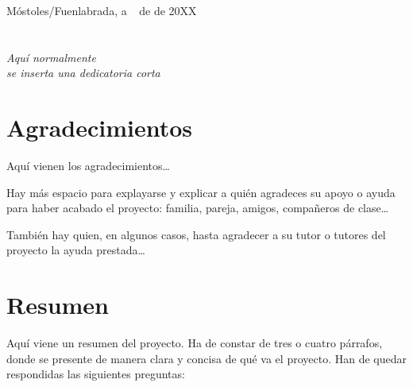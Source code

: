 \documentclass[
paper=a4,
fontsize=12pt,
twoside,
openright,                  %
titlepage,                  %
headsepline,                %
footheight=16pt,            %
parskip=half+,				%
numbers=noenddot,			%
headinclude=true,           %
footinclude=true,           %
cleardoublepage=empty,      %
captions=tableheading,      %
BCOR=12mm, 				    %
DIV=12   			        %
usegeometry=true			%
]{scrbook}
\begin{document}
{\vspace{0.8cm}
\begin{flushright}
Móstoles/Fuenlabrada, a \qquad$\;\,$ de \qquad\qquad\qquad\qquad de 20XX
\end{flushright}


\chapter*{}
\begin{flushright}
\textit{Aquí normalmente \\
se inserta una dedicatoria corta \\}
\end{flushright}


\chapter*{Agradecimientos}

Aquí vienen los agradecimientos\ldots

Hay más espacio para explayarse y explicar a quién agradeces su apoyo o ayuda para
haber acabado el proyecto: familia, pareja, amigos, compañeros de clase\ldots

También hay quien, en algunos casos, hasta agradecer a su tutor o tutores del proyecto
la ayuda prestada\ldots


\chapter*{Resumen}

Aquí viene un resumen del proyecto.
Ha de constar de tres o cuatro párrafos, donde se presente de manera clara y concisa de qué va el proyecto. 
Han de quedar respondidas las siguientes preguntas:

}
\end{document}
